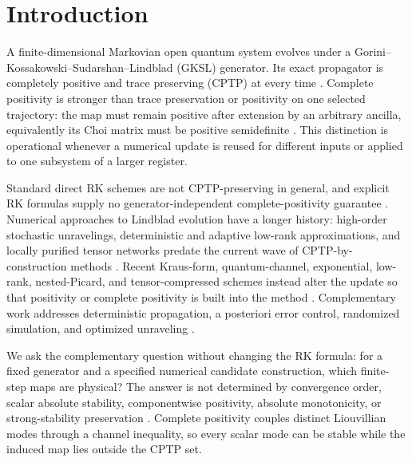 \section{Introduction}
\label{sec:introduction}

A finite-dimensional Markovian open quantum system evolves under a Gorini--Kossakowski--Sudarshan--Lindblad (GKSL) generator. Its exact propagator is completely positive and trace preserving (CPTP) at every time \cite{Lindblad1976,GoriniKossakowskiSudarshan1976,BreuerPetruccione2002}. Complete positivity is stronger than trace preservation or positivity on one selected trajectory: the map must remain positive after extension by an arbitrary ancilla, equivalently its Choi matrix must be positive semidefinite \cite{Choi1975CP,Kraus1971,Stinespring1955}. This distinction is operational whenever a numerical update is reused for different inputs or applied to one subsystem of a larger register.

Standard direct RK schemes are not CPTP-preserving in general, and explicit RK formulas supply no generator-independent complete-positivity guarantee \cite{RieschJirauschek2019,AppeloCheng2025}. Numerical approaches to Lindblad evolution have a longer history: high-order stochastic unravelings, deterministic and adaptive low-rank approximations, and locally purified tensor networks predate the current wave of CPTP-by-construction methods \cite{SteinbachGarrawayKnight1995,LeBrisRouchon2013,LeBrisRouchonRoussel2015,WernerEtAl2016}. Recent Kraus-form, quantum-channel, exponential, low-rank, nested-Picard, and tensor-compressed schemes instead alter the update so that positivity or complete positivity is built into the method \cite{RieschPiklJirauschek2020,CaoLu2025,AppeloCheng2025,RobinRouchonSellem2025,ChenEtAl2026,GodinezRamirez2025,HuAppeloCheng2025NPI,DelMastroAppeloCheng2026TT,HuAppeloCheng2026Gregory}. Complementary work addresses deterministic propagation, a posteriori error control, randomized simulation, and optimized unraveling \cite{GuZhang2025,TureHyeonJang2026,EtienneyRobinRouchon2026,ChenLiLuYing2025,CaoHeLi2026Unraveling}.

We ask the complementary question without changing the RK formula: for a fixed generator and a specified numerical candidate construction, which finite-step maps are physical? The answer is not determined by convergence order, scalar absolute stability, componentwise positivity, absolute monotonicity, or strong-stability preservation \cite{BolleyCrouzeix1978,Kraaijevanger1986Absolute,Kraaijevanger1991Contractivity,Horvath1998Positivity,Horvath2005Threshold,GottliebShuTadmor2001,FerracinaSpijker2004,Higueras2005,BlanesIserlesMacnamara2022}. Complete positivity couples distinct Liouvillian modes through a channel inequality, so every scalar mode can be stable while the induced map lies outside the CPTP set.


